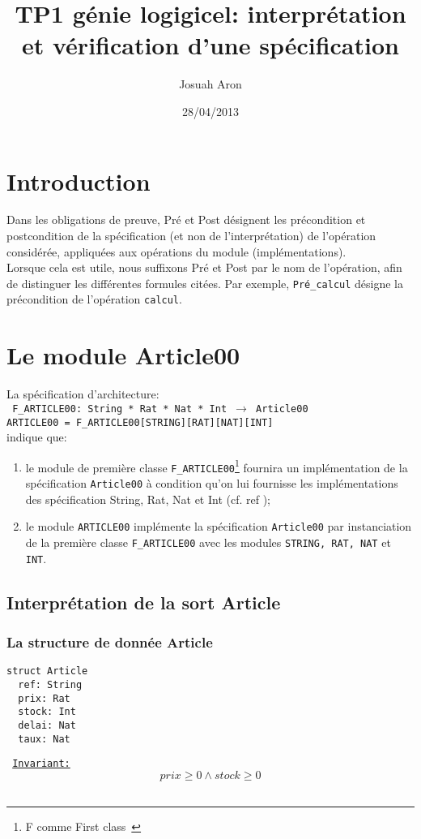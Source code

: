 \documentclass{article}
\author{Josuah Aron}
\date{28/04/2013}
\title{TP1 génie logigicel: interprétation et vérification d'une spécification}
\begin{document}
\maketitle
\tableofcontents

\section{Introduction}
Dans les obligations de preuve, Pré et Post désignent les précondition et postcondition de la spécification (et non de l'interprétation) de l'opération considérée, appliquées aux opérations du module (implémentations).\\
Lorsque cela est utile, nous suffixons Pré et Post par le nom de l'opération, afin de distinguer les différentes formules citées. Par exemple, \texttt{Pré\_calcul} désigne la précondition de l'opération \texttt{calcul}.

\section{Le module Article00}
La spécification d'architecture:\\
{\tt
F\_ARTICLE00: String * Rat * Nat * Int $\rightarrow$ Article00\\
ARTICLE00 = F\_ARTICLE00[STRING][RAT][NAT][INT]\\
}
indique que:
\begin{enumerate}
\item le module de première classe \texttt{F\_ARTICLE00}\footnote{F comme \og First class\ \fg} fournira un implémentation de la spécification \texttt{Article00} à condition qu'on lui fournisse les implémentations des spécification String, Rat, Nat et Int (cf. ref \cite{Architectural:specifications:in:CASL});
\item le module \texttt{ARTICLE00} implémente la spécification \texttt{Article00} par instanciation de la première classe \texttt{F\_ARTICLE00} avec les modules \texttt{STRING, RAT, NAT} et \texttt{INT}.
\end{enumerate}

\subsection{Interprétation de la sort Article}
\subsubsection{La structure de donnée Article}
\begin{verbatim}
struct Article
  ref: String
  prix: Rat
  stock: Int
  delai: Nat
  taux: Nat
\end{verbatim}
{\tt
\underline{Invariant:}
$$ prix \ge 0 \wedge stock \ge 0 $$
}
\end{document}

